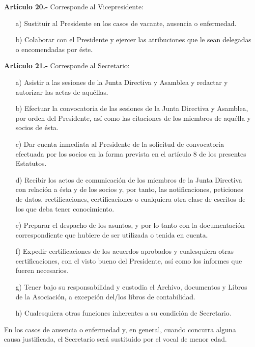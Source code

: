 \documentclass[a4paper,12pt]{article}
\begin{document}
\begin{onehalfspace}
\bigskip\bigskip

\textbf{Art\'iculo 20.-} Corresponde al Vicepresidente:
\begin{itemize}
\item [a)]  Sustituir al Presidente en los casos de vacante, ausencia o enfermedad.
\item [b)]  Colaborar con el Presidente y ejercer las atribuciones que le sean delegadas o encomendadas por \'este.
\end{itemize}

\bigskip\bigskip

\textbf{Art\'iculo 21.-} Corresponde al Secretario:
\begin{itemize}
\item [a)] Asistir a las sesiones de la Junta Directiva y Asamblea y redactar y autorizar las actas de aqu\'ellas.
\item [b)] Efectuar la convocatoria de las sesiones de la Junta Directiva y Asamblea, por orden del Presidente, as\'i como las citaciones de los miembros de aqu\'ella y socios de \'esta.
\item [c)] Dar cuenta inmediata al Presidente de la solicitud de convocatoria efectuada por los socios en la forma prevista en el art\'iculo 8 de los presentes Estatutos.
\item [d)] Recibir los actos de comunicaci\'on de los miembros de la Junta Directiva con relaci\'on a \'esta y de los socios y, por tanto, las notificaciones, peticiones de datos, rectificaciones, certificaciones o cualquiera otra clase de escritos de los que deba tener conocimiento.
\item [e)] Preparar el despacho de los asuntos, y por lo tanto con la documentaci\'on correspondiente que hubiere de ser utilizada o tenida en cuenta.
\item [f)] Expedir certificaciones de los acuerdos aprobados y cualesquiera otras certificaciones, con el visto bueno del Presidente, as\'i como los informes que fueren necesarios.
\item [g)] Tener bajo su responsabilidad y custodia el Archivo, documentos y Libros de la Asociaci\'on, a excepci\'on del/los libros de contabilidad.
\item [h)] Cualesquiera otras funciones inherentes a su condici\'on de Secretario.
\end{itemize}

En los casos de ausencia o enfermedad y, en general, cuando concurra alguna causa justificada, el Secretario ser\'a sustituido por el vocal de menor edad.


\end{onehalfspace}
\end{document}
